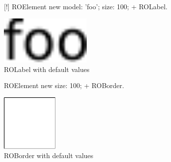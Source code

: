 \documentclass[a4paper,10pt,twoside]{book}
\begin{document}
\begin{figure}[H]
      \begin{minipage}[t]{0.5\textwidth}
      \vspace{0pt}
	     \begin{code}{}[!]
	ROElement new
		model: 'foo';
		size: 100; 
		+ ROLabel.	\end{code}
   \end{minipage}
   \hfill
   \begin{minipage}[t]{0.4\textwidth}
      \vspace{0pt} \raggedright
       \centering
		\includegraphics[width=0.4\textwidth]{label}
   \end{minipage}
\caption{ROLabel with default values}
\label{fig:label}
\end{figure}

\begin{figure}[H]
      \begin{minipage}[t]{0.5\textwidth}
      \vspace{0pt}
     \begin{code}{}
	ROElement new 
		size: 100; 
		+ ROBorder.	\end{code}
   \end{minipage}
   \hfill
   \begin{minipage}[t]{0.4\textwidth}
      \vspace{0pt} \raggedright
       \centering
		\includegraphics[width=0.25\textwidth]{border}
   \end{minipage}
\caption{ROBorder with default values}
\label{fig:border}
\end{figure}  
\end{document}
